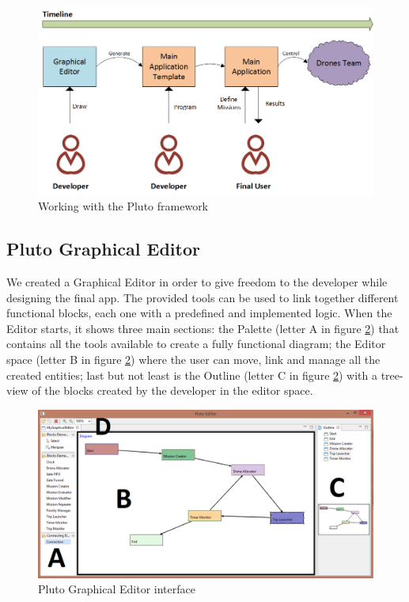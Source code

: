 \begin{figure}[htb]
  \centering
  \includegraphics[width=\linewidth]{pictures/lifeCycle.png}
  \caption{Working with the Pluto framework}
  \label{fig:lifeCycle}
\end{figure}

\subsection{Pluto Graphical Editor}
\label{plutoGraphicalEditor}

We created a Graphical Editor in order to give freedom to the developer while designing the final app. The provided tools can be used to link together different functional blocks, each one with a predefined and implemented logic.
When the Editor starts, it shows three main sections: the Palette (letter A in figure \ref{fig:GraphicalEditor}) that contains all the tools available to create a fully functional diagram; the Editor space (letter B in figure \ref{fig:GraphicalEditor}) where the user can move, link and manage all the created entities; last but not least is the Outline (letter C in figure \ref{fig:GraphicalEditor}) with a tree-view of the blocks created by the developer in the editor space.

\begin{figure}[htb]
  \centering
  \includegraphics[width=\linewidth]{pictures/EditorScreen.png}
  \caption{Pluto Graphical Editor interface}
  \label{fig:GraphicalEditor}
\end{figure}

